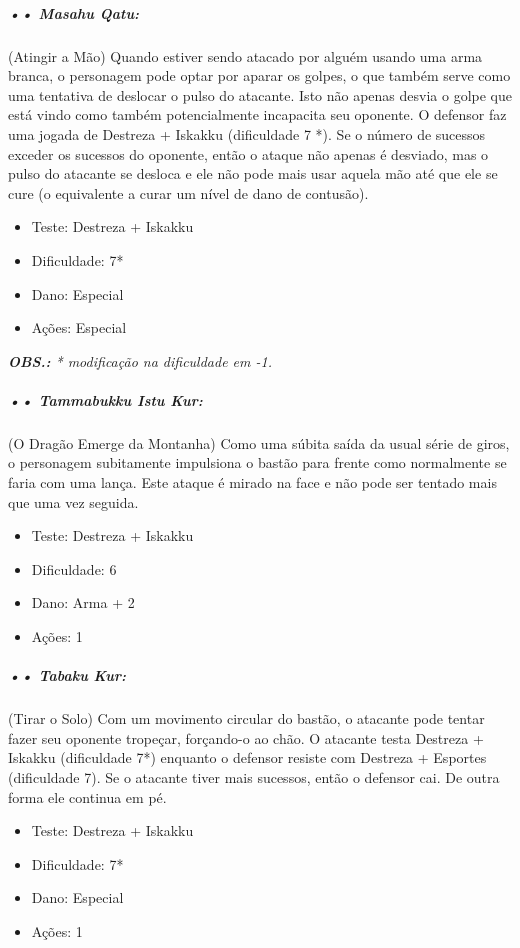 \subparagraph{\bf •• Masahu Qatu:}
(Atingir a Mão) Quando estiver sendo atacado por alguém usando uma arma branca, o personagem pode optar por aparar os golpes, o que também serve como uma tentativa de deslocar o pulso do atacante. Isto não apenas desvia o golpe que está vindo como também potencialmente incapacita seu oponente. O defensor faz uma jogada de Destreza + Iskakku (dificuldade 7 *). Se o número de sucessos exceder os sucessos do oponente, então o ataque não apenas é desviado, mas o pulso do atacante se desloca e ele não pode mais usar aquela mão até que ele se cure (o equivalente a curar um nível de dano de contusão).
\begin{itemize}[noitemsep]
\item Teste: Destreza + Iskakku
\item Dificuldade: 7*
\item Dano: Especial
\item Ações: Especial
\end{itemize}

\textit{{\bf OBS.: } * modificação na dificuldade em -1.}

\subparagraph{\bf •• Tammabukku Istu Kur:}
(O Dragão Emerge da Montanha) Como uma súbita saída da usual série de giros, o personagem subitamente impulsiona o bastão para frente como normalmente se faria com uma lança. Este ataque é mirado na face e não pode ser tentado mais que uma vez seguida. 
\begin{itemize}[noitemsep]
\item Teste: Destreza + Iskakku
\item Dificuldade: 6
\item Dano: Arma + 2
\item Ações: 1
\end{itemize}

\subparagraph{\bf •• Tabaku Kur:}
(Tirar o Solo) Com um movimento circular do bastão, o atacante pode tentar fazer seu oponente tropeçar, forçando-o ao chão. O atacante testa Destreza + Iskakku (dificuldade 7*) enquanto o defensor resiste com Destreza + Esportes (dificuldade 7). Se o atacante tiver mais sucessos, então o defensor cai. De outra forma ele continua em pé. 
\begin{itemize}[noitemsep]
\item Teste: Destreza + Iskakku
\item Dificuldade: 7*
\item Dano: Especial
\item Ações: 1
\end{itemize}

